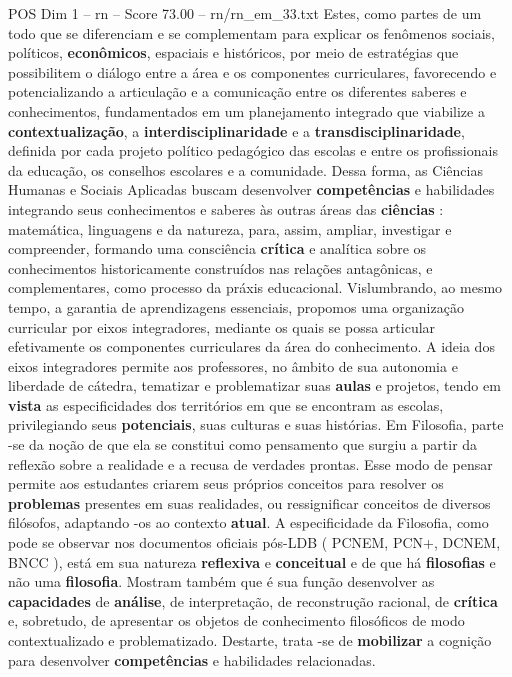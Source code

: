 \begin{textsample}{POS Dim 1 – rn – Score 73.00 – rn/rn\_em\_33.txt}
Estes, como partes de um todo que se diferenciam e se complementam para explicar os fenômenos sociais, políticos, \textbf{econômicos}, espaciais e históricos, por meio de estratégias que possibilitem o diálogo entre a área e os componentes curriculares, favorecendo e potencializando a articulação e a comunicação entre os diferentes saberes e conhecimentos, fundamentados em um planejamento integrado que viabilize a \textbf{contextualização}, a \textbf{interdisciplinaridade} e a \textbf{transdisciplinaridade}, definida por cada projeto político pedagógico das escolas e entre os profissionais da educação, os conselhos escolares e a comunidade.
Dessa forma, as Ciências Humanas e Sociais Aplicadas buscam desenvolver \textbf{competências} e habilidades integrando seus conhecimentos e saberes às outras áreas das \textbf{ciências} : matemática, linguagens e da natureza, para, assim, ampliar, investigar e compreender, formando uma consciência \textbf{crítica} e analítica sobre os conhecimentos historicamente construídos nas relações antagônicas, e complementares, como processo da práxis educacional.
Vislumbrando, ao mesmo tempo, a garantia de aprendizagens essenciais, propomos uma organização curricular por eixos integradores, mediante os quais se possa articular efetivamente os componentes curriculares da área do conhecimento.
A ideia dos eixos integradores permite aos professores, no âmbito de sua autonomia e liberdade de cátedra, tematizar e problematizar suas \textbf{aulas} e projetos, tendo em \textbf{vista} as especificidades dos territórios em que se encontram as escolas, privilegiando seus \textbf{potenciais}, suas culturas e suas histórias.
Em Filosofia, parte -se da noção de que ela se constitui como pensamento que surgiu a partir da reflexão sobre a realidade e a recusa de verdades prontas.
Esse modo de pensar permite aos estudantes criarem seus próprios conceitos para resolver os \textbf{problemas} presentes em suas realidades, ou ressignificar conceitos de diversos filósofos, adaptando -os ao contexto \textbf{atual}.
A especificidade da Filosofia, como pode se observar nos documentos oficiais pós-LDB ( PCNEM, PCN+, DCNEM, BNCC ), está em sua natureza \textbf{reflexiva} e \textbf{conceitual} e de que há \textbf{filosofias} e não uma \textbf{filosofia}.
Mostram também que é sua função desenvolver as \textbf{capacidades} de \textbf{análise}, de interpretação, de reconstrução racional, de \textbf{crítica} e, sobretudo, de apresentar os objetos de conhecimento filosóficos de modo contextualizado e problematizado.
Destarte, trata -se de \textbf{mobilizar} a cognição para desenvolver \textbf{competências} e habilidades relacionadas.

\end{textsample}
